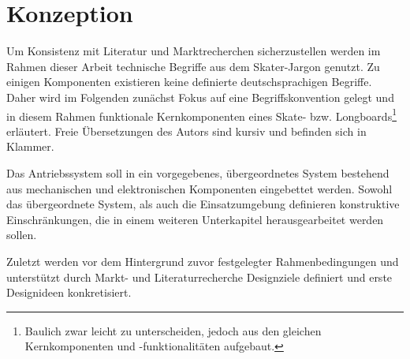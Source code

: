 \chapter{Konzeption}\label{sec:conception}
%
%
%
%
%
%
	Um Konsistenz mit Literatur und Marktrecherchen sicherzustellen werden im Rahmen dieser Arbeit technische Begriffe aus dem Skater-Jargon genutzt.
	Zu einigen Komponenten existieren keine definierte deutschsprachigen Begriffe.
	Daher wird im Folgenden zunächst Fokus auf eine Begriffskonvention gelegt und in diesem Rahmen funktionale Kernkomponenten eines Skate- bzw. Longboards\footnote{\hspace{1mm} Baulich zwar leicht zu unterscheiden, jedoch aus den gleichen Kernkomponenten und -funktionalitäten aufgebaut.} erläutert.
	Freie Übersetzungen des Autors sind kursiv und befinden sich in Klammer.\par\medskip
	Das Antriebssystem soll in ein vorgegebenes, übergeordnetes System bestehend aus mechanischen und elektronischen Komponenten eingebettet werden.
	Sowohl das übergeordnete System, als auch die Einsatzumgebung definieren konstruktive Einschränkungen, die in einem weiteren Unterkapitel herausgearbeitet werden sollen.\par\medskip
	Zuletzt werden vor dem Hintergrund zuvor festgelegter Rahmenbedingungen und unterstützt durch Markt- und Literaturrecherche Designziele definiert und erste Designideen konkretisiert.
